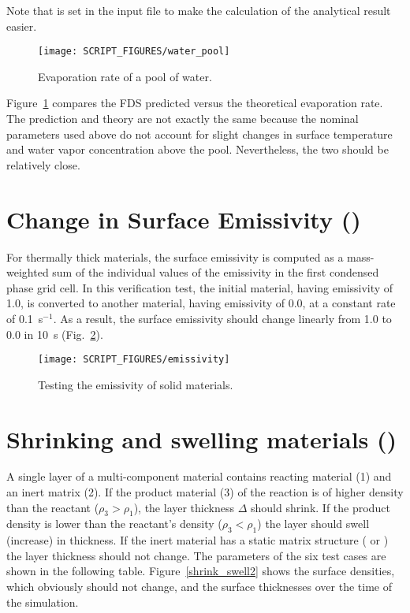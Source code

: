 \documentclass[11pt]{book}
\begin{document}
Note that  is set in the input file to make the calculation of the analytical result easier.

\begin{figure}[!ht]
\centering
\texttt{[image: SCRIPT\_FIGURES/water\_pool]}
\caption[The  test case]{Evaporation rate of a pool of water.}
\label{water_pool_fig}
\end{figure}

Figure~\ref{water_pool_fig} compares the FDS predicted versus the theoretical evaporation rate. The prediction and theory are not exactly the same because the nominal parameters used above do not account for slight changes in surface temperature and water vapor concentration above the pool. Nevertheless, the two should be relatively close.

\FloatBarrier


\section{Change in Surface Emissivity (\texorpdfstring{}{emissivity})}

For thermally thick materials, the surface emissivity is computed as a mass-weighted sum of the individual values of the emissivity in the first condensed phase grid cell. In this verification test, the initial material, having emissivity of 1.0, is converted to another material, having emissivity of 0.0, at a constant rate of 0.1~s$^{-1}$. As a result, the surface emissivity should change linearly from 1.0 to 0.0 in 10~s (Fig.~\ref{emissivity}).

\begin{figure}[!htb]
\centering
\texttt{[image: SCRIPT\_FIGURES/emissivity]}
\caption[The  test case]{Testing the emissivity of solid materials.}
\label{emissivity}
\end{figure}




\section{Shrinking and swelling materials (\texorpdfstring{}{shrink\_swell})}
\label{shrink_swell}

A single layer of a multi-component material contains reacting material (1) and an inert matrix (2). If the product material (3) of the reaction is of higher density than the reactant ($\rho_3 > \rho_1$), the layer thickness $\Delta$ should shrink. If the product density is lower than the reactant's density ($\rho_3 < \rho_1$) the layer should swell (increase) in thickness. If the inert material has a static matrix structure ( or ) the layer thickness should not change. The parameters of the six test cases are shown in the following table. Figure~\ref{shrink_swell2} shows the surface densities, which obviously should not change, and the surface thicknesses over the time of the simulation.
\end{document}
